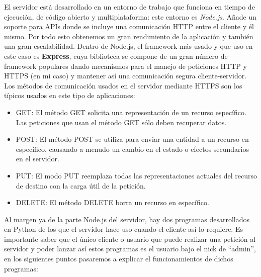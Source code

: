 \documentclass[a4paper, 12pt]{book}
\begin{document}
	El servidor está desarrollado en un entorno de trabajo que funciona en tiempo de ejecución, de código abierto y multiplataforma: este entorno es \textit{Node.js}. Añade un soporte para APIs donde se incluye una comunicación HTTP entre el cliente y él mismo. Por todo esto obtenemos un gran rendimiento de la aplicación y también una gran escalabilidad. Dentro de Node.js, el framework más usado y que uso en este caso es \textbf{Express}, cuya biblioteca se compone de un gran número de framework populares dando mecanismos para el manejo de peticiones HTTP y HTTPS (en mi caso) y mantener así una comunicación segura cliente-servidor. 
	Los métodos de comunicación usados en el servidor mediante HTTPS son los típicos usados en este tipo de aplicaciones:
	\begin{itemize}
  	\item GET: El método GET  solicita una representación de un recurso específico. Las peticiones que usan el método GET sólo deben recuperar datos.
  	\item POST: El método POST se utiliza para enviar una entidad a un recurso en específico, causando a menudo un cambio en el estado o efectos secundarios en el servidor.
  	\item PUT: El modo PUT reemplaza todas las representaciones actuales del recurso de destino con la carga útil de la petición.
  	\item DELETE: El método DELETE borra un recurso en específico.
	\end{itemize}

Al margen ya de la parte Node.js del servidor, hay dos programas desarrollados en Python de los que el servidor hace uso cuando el cliente así lo requiere. Es importante saber que el único cliente o usuario que puede realizar una petición al servidor y poder lanzar así estos programas es el usuario bajo el nick de ``admin'', en los siguientes puntos pasaremos a explicar el funcionamientos de dichos programas:
\end{document}
